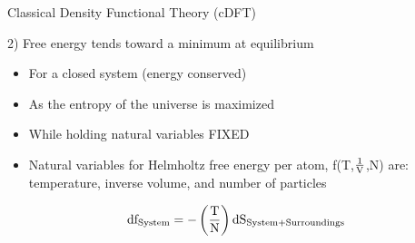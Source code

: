 \documentclass{beamer}
\renewcommand{\vec}[1]{\mathbf{#1}}
\begin{document}
\begin{frame}{Classical Density Functional Theory (cDFT)}
    \begin{block}{2) Free energy tends toward a minimum at equilibrium }
    \begin{itemize}
       \item For a closed system (energy conserved)
       \item As the entropy of the universe is maximized
       \item While holding natural variables FIXED
       \item Natural variables for Helmholtz free energy per atom, f(T,$\frac{1}{\text V}$,N) are:
       temperature, inverse volume,  and number of particles
     \end{itemize} 
     
     \begin{displaymath} \text{df}_{\text{System}}=-\left(\frac{\text T}{\text N}\right)\text{dS}_{\text{System+Surroundings}} \end{displaymath}
     \end{block}     
\end{frame}
\end{document}
